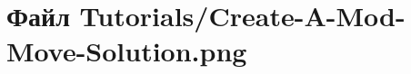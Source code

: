 \hypertarget{_create-_a-_mod-_move-_solution_8png}{}\section{Файл Tutorials/\+Create-\/\+A-\/\+Mod-\/\+Move-\/\+Solution.png}
\label{_create-_a-_mod-_move-_solution_8png}
